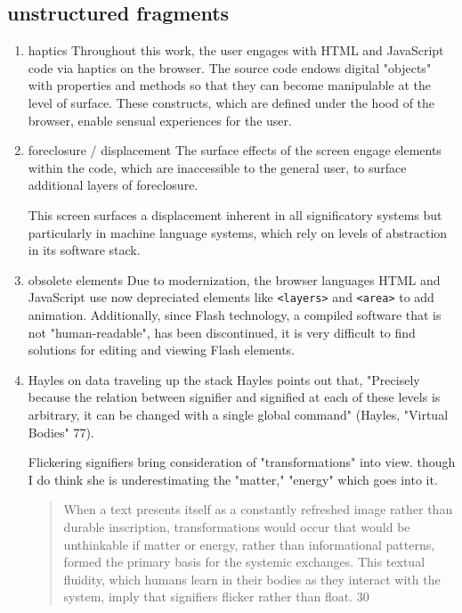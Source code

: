 \documentclass[11pt]{article}
\begin{document}
\subsection{unstructured fragments}
\label{sec:org5de4152}

\begin{enumerate}
\item haptics
\label{sec:orgb51234a}
Throughout this work, the user engages with HTML and JavaScript code
via haptics on the browser. The source code endows digital "objects"
with properties and methods so that they can become manipulable at the
level of surface. These constructs, which are defined under the hood
of the browser, enable sensual experiences for the user. 

\item foreclosure / displacement
\label{sec:orgf7968bd}
The surface effects of the screen engage elements within the code,
which are inaccessible to the general user, to surface additional
layers of foreclosure.

This screen surfaces a displacement inherent in all
significatory systems but particularly in machine language systems,
which rely on levels of abstraction in its software stack.

\item obsolete elements
\label{sec:org6690c5b}
Due to modernization, the browser languages HTML and JavaScript use
now depreciated elements like \texttt{<layers>} and \texttt{<area>} to add
animation. Additionally, since Flash technology, a compiled software
that is not "human-readable", has been discontinued, it is very
difficult to find solutions for editing and viewing Flash elements.

\item Hayles on data traveling up the stack
\label{sec:orgef49d19}
Hayles points out that, "Precisely because the relation between
signifier and signified at each of these levels is arbitrary, it can
be changed with a single global command" (Hayles, "Virtual Bodies"
77).

Flickering signifiers bring consideration of "transformations" into
view. though I do think she is underestimating the "matter," "energy"
which goes into it. 
\begin{quote}
When a text presents itself as a constantly refreshed image rather
than durable inscription, transformations would occur that would be
unthinkable if matter or energy, rather than informational patterns,
formed the primary basis for the systemic exchanges. This textual
fluidity, which humans learn in their bodies as they interact with the
system, imply that signifiers flicker rather than float. 30
\end{quote}


\end{enumerate}
\end{document}
